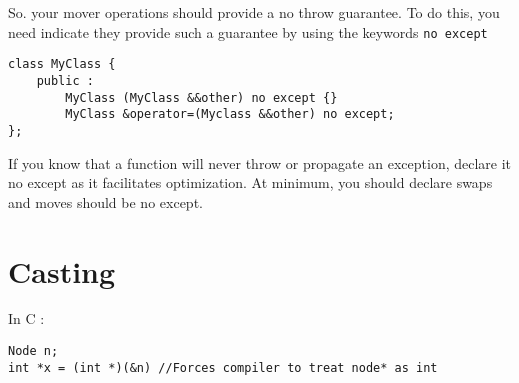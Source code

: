 \documentclass{article}
\begin{document}
So. your mover operations should provide a no throw guarantee. To do this, you need indicate they provide such a guarantee by using the keywords \verb|no except|

\begin{lstlisting}
class MyClass {
	public : 
		MyClass (MyClass &&other) no except {}
		MyClass &operator=(Myclass &&other) no except;
};
\end{lstlisting}

If you know that a function will never throw or propagate an exception, declare it no except as it facilitates optimization. At minimum, you should declare swaps and moves should be no except. 

\section{Casting}

In C : 
\begin{lstlisting}
Node n;
int *x = (int *)(&n) //Forces compiler to treat node* as int 
\end{lstlisting}
\end{document}
